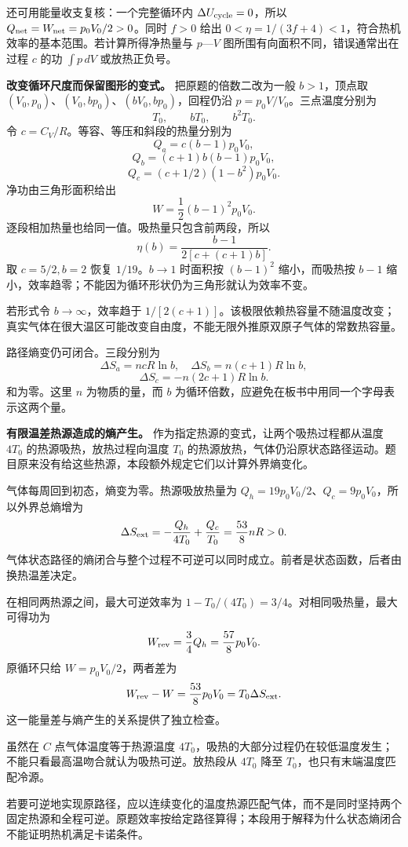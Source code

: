 \documentclass[12pt,a4paper,UTF8]{ctexart}
\begin{document}
还可用能量收支复核：一个完整循环内 \(\Delta U_{\rm cycle}=0\)，所以
\(Q_{\rm net}=W_{\rm net}=p_0V_0/2>0\)。同时 \(f>0\) 给出
\(0<\eta=1/(3f+4)<1\)，符合热机效率的基本范围。若计算所得净热量与
\(p\)---\(V\) 图所围有向面积不同，错误通常出在过程 \(c\) 的功
\(\int p\,dV\) 或放热正负号。

\textbf{改变循环尺度而保留图形的变式。} 把原题的倍数二改为一般
\(b>1\)，顶点取 \((V_0,p_0)\)、\((V_0,bp_0)\)、\((bV_0,bp_0)\)，回程仍沿
\(p=p_0V/V_0\)。三点温度分别为 \[
T_0,\qquad bT_0,\qquad b^2T_0.
\] 令 \(c=C_V/R\)。等容、等压和斜段的热量分别为 \[
Q_a=c(b-1)p_0V_0,
\] \[
Q_b=(c+1)b(b-1)p_0V_0,
\] \[
Q_c=(c+1/2)(1-b^2)p_0V_0.
\] 净功由三角形面积给出 \[
W=\frac12(b-1)^2p_0V_0.
\] 逐段相加热量也给同一值。吸热量只包含前两段，所以 \[
\eta(b)=\frac{b-1}{2[c+(c+1)b]}.
\] 取 \(c=5/2,b=2\) 恢复 \(1/19\)。\(b\to1\) 时面积按 \((b-1)^2\)
缩小，而吸热按 \(b-1\)
缩小，效率趋零；不能因为循环形状仍为三角形就认为效率不变。

若形式令 \(b\to\infty\)，效率趋于
\(1/[2(c+1)]\)。该极限依赖热容量不随温度改变；真实气体在很大温区可能改变自由度，不能无限外推原双原子气体的常数热容量。

路径熵变仍可闭合。三段分别为 \[
\Delta S_a=ncR\ln b,
\quad\Delta S_b=n(c+1)R\ln b,
\] \[
\Delta S_c=-n(2c+1)R\ln b.
\] 和为零。这里 \(n\) 为物质的量，而 \(b\)
为循环倍数，应避免在板书中用同一个字母表示这两个量。

\textbf{有限温差热源造成的熵产生。}
作为指定热源的变式，让两个吸热过程都从温度 \(4T_0\)
的热源吸热，放热过程向温度 \(T_0\)
的热源放热，气体仍沿原状态路径运动。题目原来没有给这些热源，本段额外规定它们以计算外界熵变化。

气体每周回到初态，熵变为零。热源吸放热量为
\(Q_h=19p_0V_0/2\)、\(Q_c=9p_0V_0\)，所以外界总熵增为 \[
\Delta S_{\rm ext}=-\frac{Q_h}{4T_0}+\frac{Q_c}{T_0}
=\frac{53}{8}nR>0.
\]
气体状态路径的熵闭合与整个过程不可逆可以同时成立。前者是状态函数，后者由换热温差决定。

在相同两热源之间，最大可逆效率为
\(1-T_0/(4T_0)=3/4\)。对相同吸热量，最大可得功为 \[
W_{\rm rev}=\frac34Q_h=\frac{57}{8}p_0V_0.
\] 原循环只给 \(W=p_0V_0/2\)，两者差为 \[
W_{\rm rev}-W=\frac{53}{8}p_0V_0
=T_0\Delta S_{\rm ext}.
\] 这一能量差与熵产生的关系提供了独立检查。

虽然在 \(C\) 点气体温度等于热源温度
\(4T_0\)，吸热的大部分过程仍在较低温度发生；不能只看最高温吻合就认为吸热可逆。放热段从
\(4T_0\) 降至 \(T_0\)，也只有末端温度匹配冷源。

若要可逆地实现原路径，应以连续变化的温度热源匹配气体，而不是同时坚持两个固定热源和全程可逆。原题效率按给定路径算得；本段用于解释为什么状态熵闭合不能证明热机满足卡诺条件。
\end{document}
